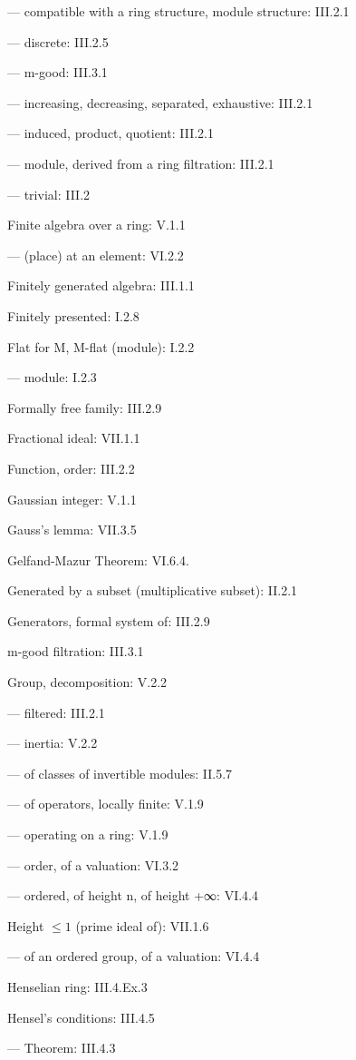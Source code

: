 --- compatible with a ring structure, module structure: III.2.1

--- discrete: III.2.5

--- m-good: III.3.1

--- increasing, decreasing, separated, exhaustive: III.2.1

--- induced, product, quotient: III.2.1

--- module, derived from a ring filtration: III.2.1

--- trivial: III.2

Finite algebra over a ring: V.1.1

--- (place) at an element: VI.2.2

Finitely generated algebra: III.1.1

Finitely presented: I.2.8

Flat for M, M-flat (module): I.2.2

--- module: I.2.3

Formally free family: III.2.9

Fractional ideal: VII.1.1

Function, order: III.2.2

Gaussian integer: V.1.1

Gauss's lemma: VII.3.5

Gelfand-Mazur Theorem: VI.6.4.

Generated by a subset (multiplicative subset): II.2.1

Generators, formal system of: III.2.9

m-good filtration: III.3.1

Group, decomposition: V.2.2

--- filtered: III.2.1

--- inertia: V.2.2

--- of classes of invertible modules: II.5.7

--- of operators, locally finite: V.1.9

--- operating on a ring: V.1.9

--- order, of a valuation: VI.3.2

--- ordered, of height n, of height +∞: VI.4.4

Height \(\leqslant 1\) (prime ideal of): VII.1.6

--- of an ordered group, of a valuation: VI.4.4

Henselian ring: III.4.Ex.3

Hensel's conditions: III.4.5

--- Theorem: III.4.3

